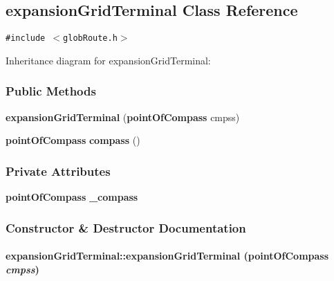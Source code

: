 \subsection{expansion\-Grid\-Terminal  Class Reference}
\label{expansionGridTerminal}
{\tt \#include $<$glob\-Route.h$>$}

Inheritance diagram for expansion\-Grid\-Terminal:\begin{figure}[H]
\begin{center}
\leavevmode
\setlength{\epsfysize}{2cm}
\end{center}
\end{figure}
\subsubsection*{Public Methods}
\begin{CompactItemize}
\item 
{\bf expansion\-Grid\-Terminal} ({\bf point\-Of\-Compass} cmpss)
\item 
{\bf point\-Of\-Compass} {\bf compass} ()
\end{CompactItemize}
\subsubsection*{Private Attributes}
\begin{CompactItemize}
\item 
{\bf point\-Of\-Compass} {\bf \_\-compass}
\end{CompactItemize}


\subsubsection{Constructor \& Destructor Documentation}
\label{expansionGridTerminal_a0}
\paragraph{\setlength{\rightskip}{0pt plus 5cm}expansion\-Grid\-Terminal::expansion\-Grid\-Terminal ({\bf point\-Of\-Compass} {\em cmpss})\hspace{0.3cm}{\tt  [inline]}}\hfill



